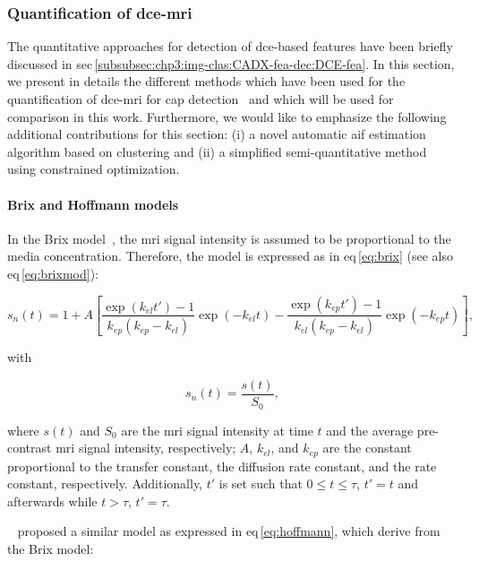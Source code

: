 \subsubsection{Quantification of \acs*{dce}-\acs*{mri}}\label{subsubsec:chp5:DCE-norm:stateart}

The quantitative approaches for detection of \ac{dce}-based features have been briefly discussed in \acs{sec}\,\ref{subsubsec:chp3:img-clas:CADX-fea-dec:DCE-fea}.
In this section, we present in details the different methods which have been used for the quantification of \ac{dce}-\ac{mri} for \ac{cap} detection~\cite{Lemaitre2015} and which will be used for comparison in this work.
Furthermore, we would like to emphasize the following additional contributions for this section: (i) a novel automatic \ac{aif} estimation algorithm based on clustering and (ii) a simplified semi-quantitative method using constrained optimization.

\paragraph{Brix and Hoffmann models}\label{par:chp5:DCE-norm:brixhoffmann}

In the Brix model~\cite{brix1991pharmacokinetic}, the \ac{mri} signal intensity is assumed to be proportional to the media concentration.
Therefore, the model is expressed as in \acs{eq}\,\eqref{eq:brix} (see also \acs{eq}\,\eqref{eq:brixmod}):

\begin{equation}
  s_n(t) = 1 + A \left[ \frac{\exp(k_{el} t') - 1}{k_{ep}(k_{ep} - k_{el})} \exp(- k_{el} t) - \frac{\exp(k_{ep} t') - 1}{k_{el}(k_{ep} - k_{el})} \exp(- k_{ep} t) \right],
  \label{eq:brix}
\end{equation}

\noindent with

\begin{equation}
  s_n(t) = \frac{s(t)}{S_0},
  \label{eq:enh}
\end{equation}

\noindent where $s(t)$ and $S_0$ are the \ac{mri} signal intensity at time $t$ and the average pre-contrast \ac{mri} signal intensity, respectively; $A$, $k_{el}$, and $k_{ep}$ are the constant proportional to the transfer constant, the diffusion rate constant, and the rate constant, respectively.
Additionally, $t'$ is set such that $0 \leq t \leq \tau$, $t' = t$ and afterwards while $t > \tau$, $t' = \tau$.

\citeauthor{hoffmann1995pharmacokinetic}~\cite{hoffmann1995pharmacokinetic} proposed a similar model as expressed in \acs{eq}\,\eqref{eq:hoffmann}, which derive from the Brix model:

